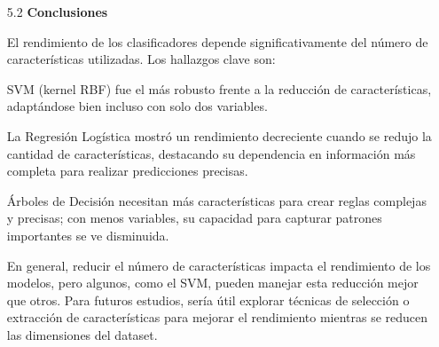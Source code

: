 \documentclass{article}
\begin{document}
\bigskip

\begin{itemize}

\item[5.2]  {\bf Conclusiones}

El rendimiento de los clasificadores depende significativamente del número de características utilizadas. Los hallazgos clave son:

SVM (kernel RBF) fue el más robusto frente a la reducción de características, adaptándose bien incluso con solo dos variables.

La Regresión Logística mostró un rendimiento decreciente cuando se redujo la cantidad de características, destacando su dependencia en información más completa para realizar predicciones precisas.

Árboles de Decisión necesitan más características para crear reglas complejas y precisas; con menos variables, su capacidad para capturar patrones importantes se ve disminuida.

En general, reducir el número de características impacta el rendimiento de los modelos, pero algunos, como el SVM, pueden manejar esta reducción mejor que otros. Para futuros estudios, sería útil explorar técnicas de selección o extracción de características para mejorar el rendimiento mientras se reducen las dimensiones del dataset.

\end{itemize}
\end{document}
